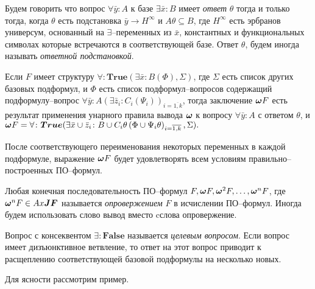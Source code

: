 \begin{definition}
\label{ircond}
Будем говорить что вопрос $\forall \bar{y}\colon A$ к базе $\exists \bar{x}\colon B$ имеет {\em ответ} $\theta$  тогда и только тогда, когда $\theta$ есть подстановка $\bar{y} \rightarrow H^{\infty}$ и $A\theta \subseteq B$, где $H^{\infty}$ есть эрбранов универсум, основанный на $\exists$--переменных из $\bar{x}$, константных и функциональных символах которые встречаются в соответствующей базе. Ответ $\theta$, будем иногда называть {\em ответной подстановкой}. 
\end{definition}


\begin{definition}
\label{omega}
Если $F$ имеет структуру $\forall\colon\boldsymbol{True}\left(\exists \bar{x}\colon B\left(\Phi\right),\Sigma\right)$, где $\Sigma$ есть список других базовых подформул, и $\Phi$ есть список подформул--вопросов содержащий подформулу--вопрос $\forall \bar{y}\colon A(\exists \bar{z}_i\colon C_i\left(\Psi_i\right))_{i=\overline{1,k}}$, тогда заключение $\boldsymbol{\omega} F$ есть результат применения унарного правила вывода $\boldsymbol{\omega}$ к вопросу $\forall \bar{y}\colon A$ с ответом $\theta$, и $\boldsymbol{\omega} F = \forall\colon\boldsymbol{True}(\exists \bar{x} \cup \bar{z}_i\colon B \cup C_i\theta\left(\Phi \cup \Psi_i\theta\right)_{i=\overline{1,k}},\Sigma).$

\end{definition}

После соответствующего переименования некоторых переменных в каждой подформуле, выражение $\boldsymbol{\omega} F$ будет удовлетворять всем условиям правильно--построенных ПО--формул.

%
Любая конечная последовательность ПО--формул $F, \boldsymbol{\omega} F, \boldsymbol{\omega}^2 F,\ldots,\boldsymbol{\omega}^n F$, где $\boldsymbol{\omega}^n F \in Ax\boldsymbol{JF}$ называется {\em опровержением} $F$ в исчислении ПО--формул. Иногда будем использовать слово вывод вместо cслова опровержение. 

Вопрос с консеквентом $\exists:\boldsymbol{False}$ называется {\em целевым вопросом}. Если вопрос имеет дизъюнктивное ветвление, то ответ на этот вопрос приводит к расщеплению соответствующей базовой подформулы на несколько новых.

Для ясности рассмотрим пример.

